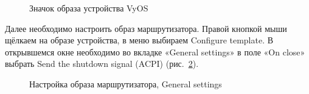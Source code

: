 \documentclass[
  english,
  russian,
  12pt,
  a4paper,
  DIV=11,
  numbers=noendperiod]{scrreprt}
\begin{document}
\begin{figure}


\caption{\label{fig-026}Значок образа устройства VyOS}

\end{figure}%

Далее необходимо настроить образ маршрутизатора. Правой кнопкой мыши
щёлкаем на образе устройства, в меню выбираем Configure template. В
открывшемся окне необходимо во вкладке «General settings» в поле «On
close» выбрать Send the shutdown signal (ACPI) (рис.~\ref{fig-027}).

\begin{figure}


\caption{\label{fig-027}Настройка образа маршрутизатора, General
settings}

\end{figure}%
\end{document}
